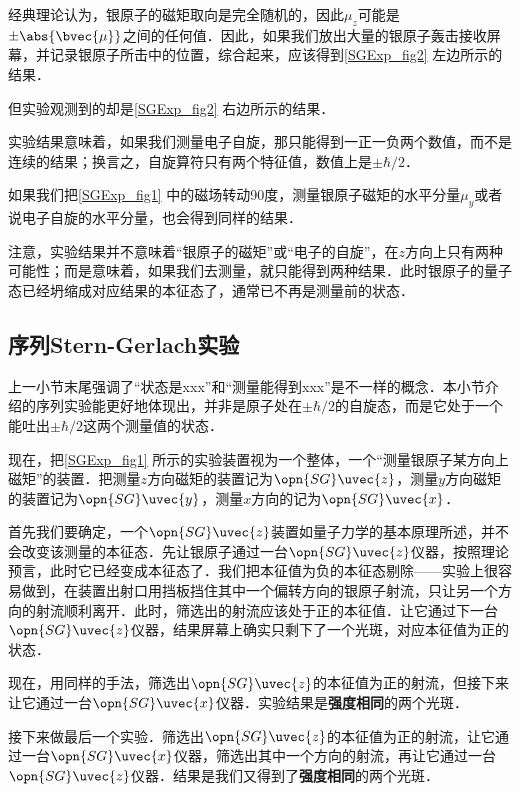 经典理论认为，银原子的磁矩取向是完全随机的，因此$\mu_z$可能是$\pm\abs{\bvec{\mu}}$之间的任何值．因此，如果我们放出大量的银原子轰击接收屏幕，并记录银原子所击中的位置，综合起来，应该得到\autoref{SGExp_fig2} 左边所示的结果．

但实验观测到的却是\autoref{SGExp_fig2} 右边所示的结果．


实验结果意味着，如果我们测量电子自旋，那只能得到一正一负两个数值，而不是连续的结果；换言之，自旋算符只有两个特征值，数值上是$\pm\hbar/2$．


如果我们把\autoref{SGExp_fig1} 中的磁场转动90度，测量银原子磁矩的水平分量$\mu_y$或者说电子自旋的水平分量，也会得到同样的结果．



注意，实验结果并不意味着“银原子的磁矩”或“电子的自旋”，在$z$方向上只有两种可能性；而是意味着，如果我们去测量，就只能得到两种结果．此时银原子的量子态已经坍缩成对应结果的本征态了，通常已不再是测量前的状态．



\subsection{序列Stern-Gerlach实验}\label{SGExp_sub1}

上一小节末尾强调了“状态是xxx”和“测量能得到xxx”是不一样的概念．本小节介绍的序列实验能更好地体现出，并非是原子处在$\pm\hbar/2$的自旋态，而是它处于一个能吐出$\pm\hbar/2$这两个测量值的状态．

现在，把\autoref{SGExp_fig1} 所示的实验装置视为一个整体，一个“测量银原子某方向上磁矩”的装置．把测量$z$方向磁矩的装置记为$\opn{SG}\uvec{z}$，测量$y$方向磁矩的装置记为$\opn{SG}\uvec{y}$，测量$x$方向的记为$\opn{SG}\uvec{x}$．

首先我们要确定，一个$\opn{SG}\uvec{z}$装置如量子力学的基本原理所述，并不会改变该测量的本征态．先让银原子通过一台$\opn{SG}\uvec{z}$仪器，按照理论预言，此时它已经变成本征态了．我们把本征值为负的本征态剔除——实验上很容易做到，在装置出射口用挡板挡住其中一个偏转方向的银原子射流，只让另一个方向的射流顺利离开．此时，筛选出的射流应该处于正的本征值．让它通过下一台$\opn{SG}\uvec{z}$仪器，结果屏幕上确实只剩下了一个光斑，对应本征值为正的状态．

现在，用同样的手法，筛选出$\opn{SG}\uvec{z}$的本征值为正的射流，但接下来让它通过一台$\opn{SG}\uvec{x}$仪器．实验结果是\textbf{强度相同}的两个光斑．

接下来做最后一个实验．筛选出$\opn{SG}\uvec{z}$的本征值为正的射流，让它通过一台$\opn{SG}\uvec{x}$仪器，筛选出其中一个方向的射流，再让它通过一台$\opn{SG}\uvec{z}$仪器．结果是我们又得到了\textbf{强度相同}的两个光斑．



